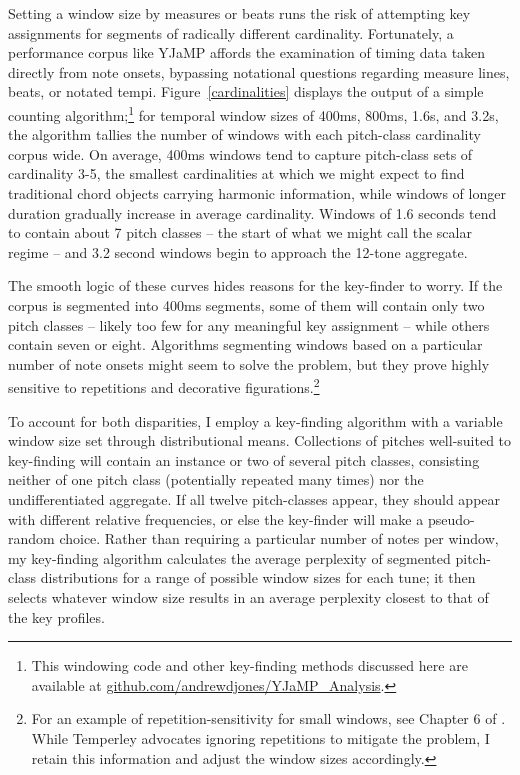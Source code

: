 Setting a window size by measures or beats runs the risk of attempting key assignments for segments of radically different cardinality.  Fortunately, a performance corpus like YJaMP affords the examination of timing data taken directly from note onsets, bypassing notational questions regarding measure lines, beats, or notated tempi.    Figure~\ref{cardinalities} displays the output of a simple counting algorithm;\footnote{This windowing code and other key-finding methods discussed here are available at \href{github.com/andrewdjones/YJaMP_Analysis}{github.com/andrewdjones/YJaMP\_Analysis}.} for temporal window sizes of 400ms, 800ms, 1.6s, and 3.2s, the algorithm tallies the number of windows with each pitch-class cardinality corpus wide.  On average, 400ms windows tend to capture pitch-class sets of cardinality 3-5, the smallest cardinalities at which we might expect to find traditional chord objects carrying harmonic information, while windows of longer duration gradually increase in average cardinality.  Windows of 1.6 seconds tend to contain about 7 pitch classes -- the start of what we might call the scalar regime -- and 3.2 second windows begin to approach the 12-tone aggregate.

The smooth logic of these curves hides reasons for the key-finder to worry.  If the corpus is segmented into 400ms segments, some of them will contain only two pitch classes -- likely too few for any meaningful key assignment -- while others contain seven or eight.  Algorithms segmenting windows based on a particular number of note onsets might seem to solve the problem, but they prove highly sensitive to repetitions and decorative figurations.\footnote{For an example of repetition-sensitivity for small windows, see Chapter 6 of \cite{temperley2007}.  While Temperley advocates ignoring repetitions to mitigate the problem, I retain this information and adjust the window sizes accordingly.}

To account for both disparities, I employ a key-finding algorithm with a variable window size set through distributional means.  Collections of pitches well-suited to key-finding will contain an instance or two of several pitch classes, consisting neither of one pitch class (potentially repeated many times) nor the undifferentiated aggregate.  If all twelve pitch-classes appear, they should appear with different relative frequencies, or else the key-finder will make a pseudo-random choice.  Rather than requiring a particular number of notes per window, my key-finding algorithm calculates the average perplexity of segmented pitch-class distributions for a range of possible window sizes for each tune; it then selects whatever window size results in an average perplexity closest to that of the key profiles.

